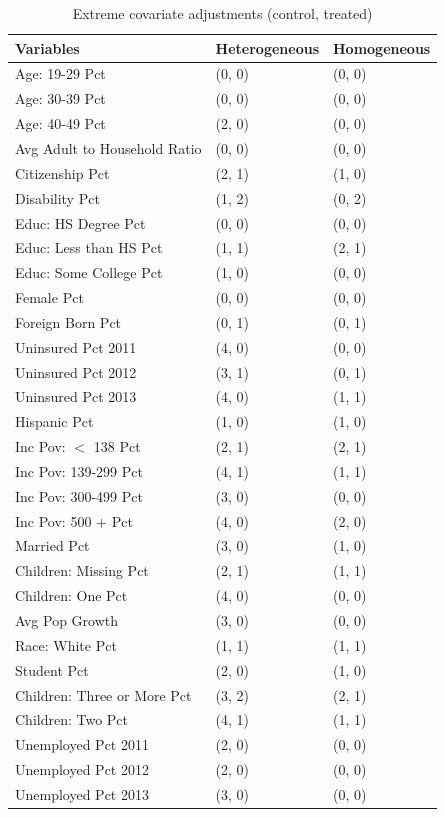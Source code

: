 \begin{table}[ht]
\centering
    \caption{Extreme covariate adjustments (control, treated)}
    \label{tab:extreme1}
\begin{tabular}{lll}
  \hline
Variables & Heterogeneous & Homogeneous \\ 
  \hline
Age: 19-29 Pct & (0, 0) & (0, 0) \\ 
  Age: 30-39 Pct & (0, 0) & (0, 0) \\ 
  Age: 40-49 Pct & (2, 0) & (0, 0) \\ 
  Avg Adult to Household Ratio & (0, 0) & (0, 0) \\ 
  Citizenship Pct & (2, 1) & (1, 0) \\ 
  Disability Pct & (1, 2) & (0, 2) \\ 
  Educ: HS Degree Pct & (0, 0) & (0, 0) \\ 
  Educ: Less than HS Pct & (1, 1) & (2, 1) \\ 
  Educ: Some College Pct & (1, 0) & (0, 0) \\ 
  Female Pct & (0, 0) & (0, 0) \\ 
  Foreign Born Pct & (0, 1) & (0, 1) \\ 
  Uninsured Pct 2011 & (4, 0) & (0, 0) \\ 
  Uninsured Pct 2012 & (3, 1) & (0, 1) \\ 
  Uninsured Pct 2013 & (4, 0) & (1, 1) \\ 
  Hispanic Pct & (1, 0) & (1, 0) \\ 
  Inc Pov: $<$ 138 Pct & (2, 1) & (2, 1) \\ 
  Inc Pov: 139-299 Pct & (4, 1) & (1, 1) \\ 
  Inc Pov: 300-499 Pct & (3, 0) & (0, 0) \\ 
  Inc Pov: 500 + Pct & (4, 0) & (2, 0) \\ 
  Married Pct & (3, 0) & (1, 0) \\ 
  Children: Missing Pct & (2, 1) & (1, 1) \\ 
  Children: One Pct & (4, 0) & (0, 0) \\ 
  Avg Pop Growth & (3, 0) & (0, 0) \\ 
  Race: White Pct & (1, 1) & (1, 1) \\ 
  Student Pct & (2, 0) & (1, 0) \\ 
  Children: Three or More Pct & (3, 2) & (2, 1) \\ 
  Children: Two Pct & (4, 1) & (1, 1) \\ 
  Unemployed Pct 2011 & (2, 0) & (0, 0) \\ 
  Unemployed Pct 2012 & (2, 0) & (0, 0) \\ 
  Unemployed Pct 2013 & (3, 0) & (0, 0) \\ 
   \hline
\end{tabular}
\end{table}

